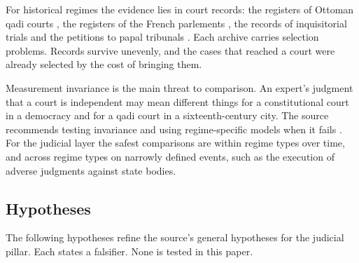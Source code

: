 \documentclass[11pt,letterpaper]{article}
\theoremstyle{definition}
\theoremstyle{remark}
\begin{document}
For historical regimes the evidence lies in court records: the registers of Ottoman qadi courts \citep{jennings1978}, the registers of the French parlements \citep{swann1995}, the records of inquisitorial trials \citep{henningsen1986} and the petitions to papal tribunals \citep{fosi2011}. Each archive carries selection problems. Records survive unevenly, and the cases that reached a court were already selected by the cost of bringing them.

Measurement invariance is the main threat to comparison. An expert's judgment that a court is independent may mean different things for a constitutional court in a democracy and for a qadi court in a sixteenth-century city. The source recommends testing invariance and using regime-specific models when it fails \citep{largo2026hbs}. For the judicial layer the safest comparisons are within regime types over time, and across regime types on narrowly defined events, such as the execution of adverse judgments against state bodies.

\subsection{Hypotheses}

The following hypotheses refine the source's general hypotheses for the judicial pillar. Each states a falsifier. None is tested in this paper.
\end{document}
